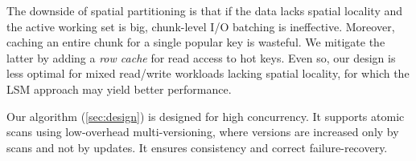 \documentclass[sigplan,10pt]{acmart}
\begin{document}
The downside of spatial partitioning is that if the data lacks spatial locality and the active working set is big, 
chunk-level I/O batching is ineffective. Moreover, 
caching an entire chunk for a single popular key is wasteful. 
We mitigate the latter by adding a \emph{row cache} for read access to hot keys. Even so, 
our design is less optimal for mixed read/write workloads lacking spatial locality, for which the LSM approach may yield better performance.  


Our algorithm (\cref{sec:design}) is designed for high concurrency. 
It supports atomic scans using low-overhead multi-versioning, where versions are increased only by scans and not by updates. 
It ensures consistency and correct failure-recovery. 
\end{document}
